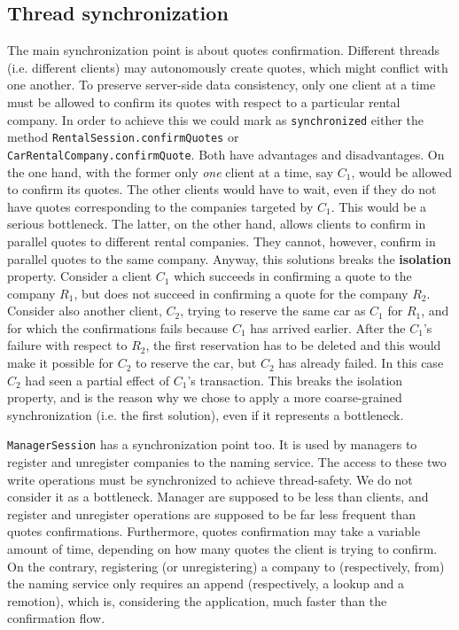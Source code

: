 \subsection{Thread synchronization}
The main synchronization point is about quotes confirmation. Different threads (i.e. different clients) may autonomously create quotes, which might conflict with one another. To preserve server-side data consistency, only one client at a time must be allowed to confirm its quotes with respect to a particular rental company. In order to achieve this we could mark as \texttt{synchronized} either the method \texttt{RentalSession.confirmQuotes} or \\\texttt{CarRentalCompany.confirmQuote}. Both have advantages and disadvantages. On the one hand, with the former only \textit{one} client at a time, say $C_1$, would be allowed to confirm its quotes. The other clients would have to wait, even if they do not have quotes corresponding to the companies targeted by $C_1$. This would be a serious bottleneck. The latter, on the other hand, allows clients to confirm in parallel quotes to different rental companies. They cannot, however, confirm in parallel quotes to the same company. Anyway, this solutions breaks the \textbf{isolation} property. Consider a client $C_1$ which succeeds in confirming a quote to the company $R_1$, but does not succeed in confirming a quote for the company $R_2$. Consider also another client, $C_2$, trying to reserve the same car as $C_1$ for $R_1$, and for which the confirmations fails because $C_1$ has arrived earlier. After the $C_1$'s failure with respect to $R_2$, the first reservation has to be deleted and this would make it possible for $C_2$ to reserve the car, but $C_2$ has already failed. In this case $C_2$ had seen a partial effect of $C_1$'s transaction. This breaks the isolation property, and is the reason why we chose to apply a more coarse-grained synchronization (i.e. the first solution), even if it represents a bottleneck.

\texttt{ManagerSession} has a synchronization point too. It is used by managers to register and unregister companies to the naming service. The access to these two write operations must be synchronized to achieve thread-safety. We do not consider it as a bottleneck. Manager are supposed to be less than clients, and register and unregister operations are supposed to be far less frequent than quotes confirmations. Furthermore, quotes confirmation may take a variable amount of time, depending on how many quotes the client is trying to confirm. On the contrary, registering (or unregistering) a company to (respectively, from) the naming service only requires an append (respectively, a lookup and a remotion), which is, considering the application, much faster than the confirmation flow.